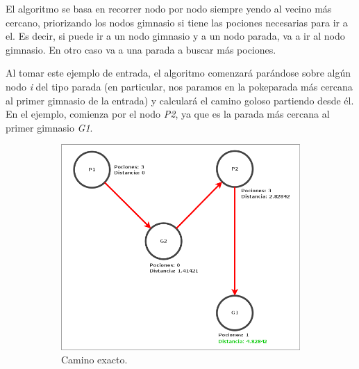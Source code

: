 \par El algoritmo se basa en recorrer nodo por nodo siempre yendo al vecino más cercano, priorizando los nodos gimnasio si tiene las pociones necesarias para ir a el. Es decir, si puede ir a un nodo gimnasio y a un nodo parada, va a ir al nodo gimnasio. En otro caso va a una parada a buscar más pociones.
\par Al tomar este ejemplo de entrada, el algoritmo comenzará parándose sobre algún nodo \textit{i} del tipo parada (en particular, nos paramos en la pokeparada más cercana al primer gimnasio de la entrada) y calculará el camino goloso partiendo desde él. En el ejemplo, comienza por el nodo \textit{P2}, ya que es la parada más cercana al primer gimnasio \textit{G1}.

\begin{figure}[H]
    \begin{subfigure}[b]{0.49\textwidth}
        \includegraphics[width=\linewidth]{img/ejercicio2/ejercicio1_ejemplo_camino1_2.png}
        \caption{Camino exacto.}
        \label{fig: ejercicio1_ejemplo_camino1_2}
    \end{subfigure}
    \begin{subfigure}[b]{0.49\textwidth}

\end{subfigure}
\end{figure}
